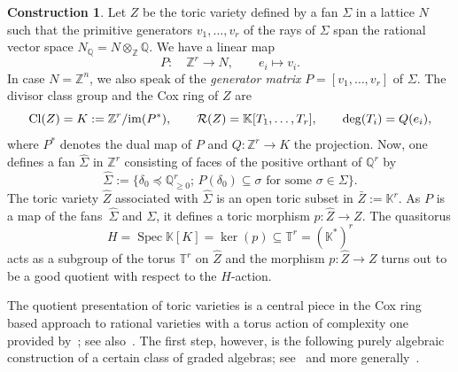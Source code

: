 \documentclass[10pt,a4paper]{amsart}
\theoremstyle{definition}
\newtheorem{construction}[thm]{Construction}
\def\Cl{{\rm Cl}}
\def\KK{{\mathbb K}}
\def\TT{{\mathbb T}}
\def\ZZ{{\mathbb Z}}
\def\QQ{{\mathbb Q}}
\def\im{{\rm im}}
\def\Spec{\operatorname{Spec}}
\def\im{{\rm im}}
\numberwithin{equation}{section}
\begin{document}
\begin{construction}
\label{constr:coxtoric}
Let $Z$ be the toric variety defined by
a fan $\Sigma$ in a lattice $N$ such that
the primitive generators $v_1,\dots, v_r$
of the rays of $\Sigma$ span the
rational vector space $N_\QQ = N \otimes_\ZZ \QQ$.
We have a linear map
\[
P \colon \quad \ZZ^r \to N,\qquad
e_i \mapsto v_i.
\]
In case $N = \ZZ^n$, we also speak
of the \emph{generator matrix}
$P = [v_1, \dots, v_r]$ of $\Sigma$.
The divisor class group and the Cox ring
of $Z$ are
\[
\Cl(Z) = K := \ZZ^r / \im(P^*),
\qquad
\mathcal{R}(Z) = \KK[T_1,\dots,T_r],
\qquad \deg(T_i) = Q(e_i),
\]
where $P^*$ denotes the dual map of $P$ and
$Q \colon \ZZ^r \to K$ the projection.
Now, one defines a fan $\hat \Sigma$ in $\ZZ^r$
consisting of faces of the positive orthant
of $\QQ^r$ by
\[
\hat \Sigma
 :=
\{\delta_0 \preceq \QQ_{\ge 0}^r; \,
P(\delta_0) \subseteq \sigma \text{ for some } \sigma \in \Sigma\}.
\]
The toric variety $\hat Z$ associated with $\hat \Sigma$
is an open toric subset in $\bar Z := \KK^r$.
As $P$ is a map of the fans~$\hat \Sigma$ and
$\Sigma$, it defines a toric morphism
$p \colon \hat Z \to Z$.
The quasitorus
\[
H = \Spec \KK[K] = \ker(p) \subseteq \TT^r = (\KK^*)^r
\]
acts as a subgroup of the torus $\TT^r$ on $\hat Z$ and the
morphism $p \colon \hat Z \to Z$ turns out to
be a good quotient with respect to the $H$-action.
\end{construction}


The quotient presentation of toric varieties is
a central piece in the Cox ring based approach
to rational varieties with a torus action of
complexity one provided by~\cite{HaHe,HaSu};
see also~\cite[Section~3.4]{ArDeHaLa}.
The first step, however, is the following purely
algebraic construction of a certain class of graded
algebras; see~\cite[Construction~3.4.2.1]{ArDeHaLa}
and more generally~\cite[Constructions~3.5 and~6.3]{HaHiWr}.
\end{document}
